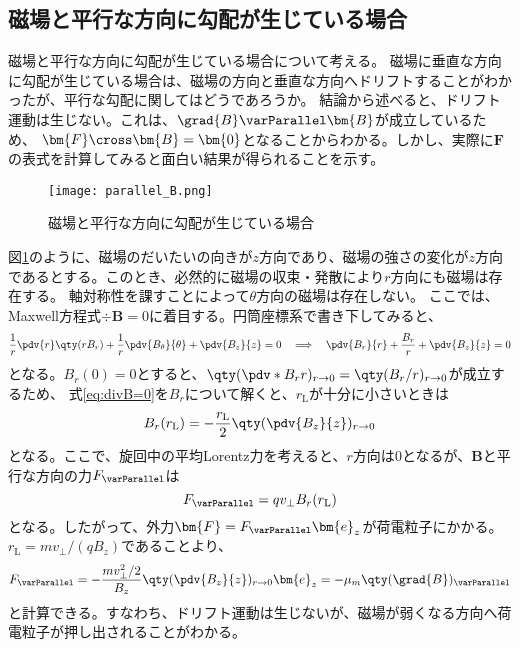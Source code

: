 \subsection{磁場と平行な方向に勾配が生じている場合}
磁場と平行な方向に勾配が生じている場合について考える。
磁場に垂直な方向に勾配が生じている場合は、磁場の方向と垂直な方向へドリフトすることがわかったが、平行な勾配に関してはどうであろうか。
結論から述べると、ドリフト運動は生じない。これは、$\grad{B}\varParallel \bm{B}$が成立しているため、
$\bm{F}\cross\bm{B} = \bm{0}$となることからわかる。しかし、実際に$\bm{F}$の表式を計算してみると面白い結果が得られることを示す。

\begin{figure}[H]
	\centering
	\texttt{[image: parallel\_B.png]}
	\caption{磁場と平行な方向に勾配が生じている場合}
	\label{fig:parallel_B}
\end{figure}
図\ref{fig:parallel_B}のように、磁場のだいたいの向きが$z$方向であり、磁場の強さの変化が$z$方向であるとする。このとき、必然的に磁場の収束・発散により$r$方向にも磁場は存在する。
軸対称性を課すことによって$\theta$方向の磁場は存在しない。
ここでは、Maxwell方程式$\div{\bm{B}} = 0$に着目する。円筒座標系で書き下してみると、
\begin{equation}
	\frac{1}{r}\pdv{r}\qty(rB_r) + \frac{1}{r}\pdv{B_\theta}{\theta} + \pdv{B_z}{z} = 0 \quad\Longrightarrow\quad \pdv{B_r}{r} + \frac{B_r}{r} + \pdv{B_z}{z} = 0
	\label{eq:divB=0}
\end{equation}
となる。$B_r(0) = 0$とすると、$\qty(\pdv*{B_r}{r})_{r\to 0} = \qty(B_r/r)_{r\to 0}$が成立するため、
式\eqref{eq:divB=0}を$B_r$について解くと、$r_{\text{L}}$が十分に小さいときは
\begin{equation}
	B_r(r_{\text{L}}) = -\frac{r_{\text{L}}}{2}\qty(\pdv{B_z}{z})_{r\to 0}
\end{equation}
となる。ここで、旋回中の平均Lorentz力を考えると、$r$方向は$0$となるが、$\bm{B}$と平行な方向の力$F_{\varParallel}$は
\begin{equation}
	F_{\varParallel} = qv_{\perp}B_r(r_{\text{L}})
\end{equation}
となる。したがって、外力$\bm{F} = F_{\varParallel}\bm{e}_z$が荷電粒子にかかる。$r_{\text{L}} = mv_{\perp}/(qB_z)$であることより、
\begin{equation}
	F_{\varParallel} = -\frac{mv^2_{\perp}/2}{B_z}\qty(\pdv{B_z}{z})_{r\to 0}\bm{e}_z = -\mu_{m}\qty(\grad{B})_{\varParallel}
\end{equation}
と計算できる。すなわち、ドリフト運動は生じないが、磁場が弱くなる方向へ荷電粒子が押し出されることがわかる。

